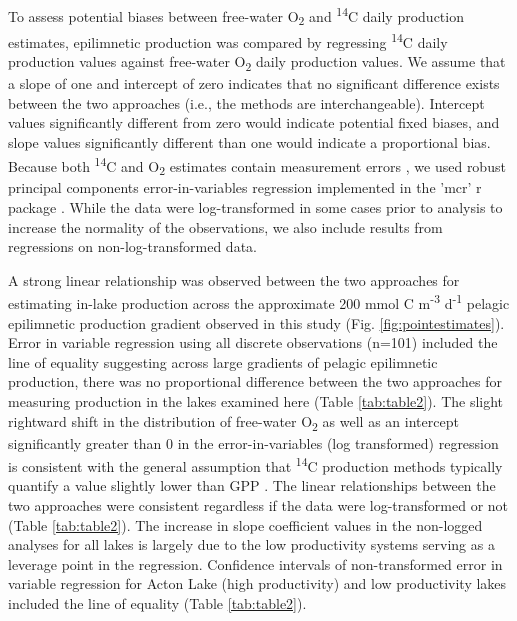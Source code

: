 \documentclass[12pt, oneside]{article}
\begin{document}
To assess potential biases between free-water O\textsubscript{2} and \textsuperscript{14}C daily production estimates, epilimnetic production was compared by regressing \textsuperscript{14}C daily production values against free-water O\textsubscript{2} daily production values. We assume that a slope of one and intercept of zero indicates that no significant difference exists between the two approaches (i.e., the methods are interchangeable). Intercept values significantly different from zero would indicate potential fixed biases, and slope values significantly different than one would indicate a proportional bias. Because both \textsuperscript{14}C and O\textsubscript{2} estimates contain measurement errors \citep{macedo_annual_2001,pemberton_quantifying_2006,solomon_ecosystem_2013}, we used robust principal components error-in-variables regression \citep{passing_new_1983} implemented in the 'mcr' r package \citep{manuilova_mcr_2014}. While the data were log-transformed in some cases prior to analysis to increase the normality of the observations, we also include results from regressions on non-log-transformed data. 

A strong linear relationship was observed between the two approaches for estimating in-lake production across the approximate 200 mmol C m\textsuperscript{-3} d\textsuperscript{-1} pelagic epilimnetic production gradient observed in this study (Fig. \ref{fig:pointestimates}). Error in variable regression using all discrete observations (n=101) included the line of equality suggesting across large gradients of pelagic epilimnetic production, there was no proportional difference between the two approaches for measuring production in the lakes examined here (Table \ref{tab:table2}). The slight rightward shift in the distribution of free-water O\textsubscript{2} as well as an intercept significantly greater than 0 in the error-in-variables (log transformed) regression is consistent with the general assumption that \textsuperscript{14}C production methods typically quantify a value slightly lower than GPP \citep{peterson_aquatic_1980,hall_measuring_2007}. The linear relationships between the two approaches were consistent regardless if the data were log-transformed or not (Table \ref{tab:table2}). The increase in slope coefficient values in the non-logged analyses for all lakes is largely due to the low productivity systems serving as a leverage point in the regression. Confidence intervals of  non-transformed error in variable regression for Acton Lake (high productivity) and low productivity lakes included the line of equality (Table \ref{tab:table2}).
\end{document}
